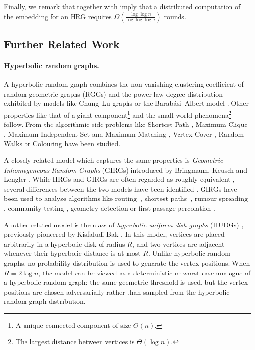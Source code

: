 \documentclass[letterpaper,11pt]{article}
\newcommand{\1}{\mathbb I}
\newcommand{\bigO}{\mathcal{O}}
\begin{document}
Finally, we remark that  together with  imply that a distributed computation of the embedding for an HRG requires $\Omega\left(\frac{\log\log n}{\log\log\log n}\right)$ rounds. %
%
\subsection{Further Related Work}
%
\paragraph{Hyperbolic random graphs.} A hyperbolic random graph combines the non-vanishing clustering coefficient of random geometric graphs (RGGs) \cite{p-rgg-03} and the power-law degree distribution exhibited by models like Chung--Lu graphs \cite{cl-ccrgg-02, cl-adrgged-02} or the Barabási–Albert model \cite{preferal-attatch}. Other properties like that of a giant component\footnote{A unique connected component of size $\Theta(n)$.} \cite{bfm-giant-15, fm-giant-18, bfkrz-esa-2023, Jorritsma2025} and the small-world phenomena\footnote{The largest distance between vertices is $\Theta(\log n)$.} \cite{DBLP:conf/analco/KiwiM15,fk-dhrg-18, ms-k-19, kostas-diameter, DBLP:journals/im/AbdullahFB17} follow. From the algorithmic side problems like Shortest Path \cite{bffkmm-icalp-2022}, Maximum Clique \cite{bfk-chrg-18}, Maximum Independent Set and Maximum Matching \cite{bfk-tw-2016}, Vertex Cover \cite{katzmann-exactvc-2023, katzmann-approxvc-2023}, Random Walks \cite{Kiwi2024} or Colouring \cite{bmrs-stacs-25, mr-soda-26} have been studied. 

A closely related model which captures the same properties is \emph{Geometric Inhomogeneous Random Graphs} (GIRGs) introduced by Bringmann, Keusch and Lengler \cite{Bringmann2019}. While HRGs and GIRGs are often regarded as roughly equivalent \cite{Komjthy2020}, several differences between the two models have been identified \cite{bmrs-stacs-25,cliques-scale-free-2024,bfk-eggihrg-22}. GIRGs have been used to analyse algorithms like routing~\cite{yannic-greedy}, shortest paths~\cite{johannes-2026}, rumour spreading \cite{kostas-rumour}, community testing \cite{Bet_Michielan_Stegehuis_2025}, geometry detection \cite{clara-21} or first passage percolation \cite{Komjthy2024}.

Another related model is the class of \emph{hyperbolic uniform disk graphs} (HUDGs) \cite{thomas-socg-25,bdhm-socg26,bks-hudg-23}; previously pioneered by Kisfaludi-Bak \cite{Kisfaludi-Bak-SODA20}. In this model, vertices are placed arbitrarily in a hyperbolic disk of radius $R$, and two vertices are adjacent whenever their hyperbolic distance is at most $R$. Unlike hyperbolic random graphs, no probability distribution is used to generate the vertex positions. When $R=2\log n$, the model can be viewed as a deterministic or worst-case analogue of a hyperbolic random graph: the same geometric threshold is used, but the vertex positions are chosen adversarially rather than sampled from the hyperbolic random graph distribution.
%
\end{document}
